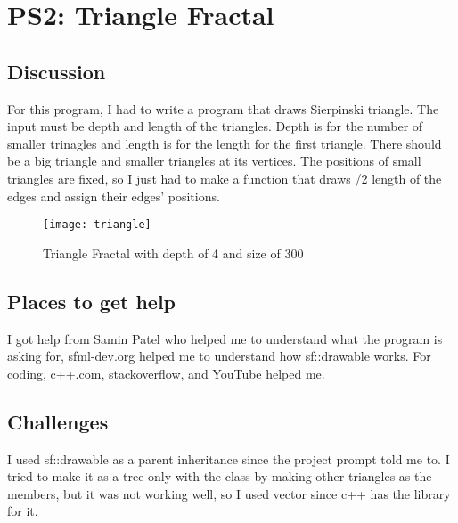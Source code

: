 \section{PS2: Triangle Fractal}\label{sec:ps2}

\subsection{Discussion}\label{sec:ps2:disc}

For this program, I had to write a program that draws Sierpinski triangle. The input must be depth and length of the triangles. Depth is for the number of smaller trinagles and length is for the length for the first triangle. There should be a big triangle and smaller triangles at its vertices. The positions of small triangles are fixed, so I just had to make a function that draws /2 length of the edges and assign their edges' positions.

\begin{figure}[tbh]
	\centering
	\texttt{[image: triangle]}
	\caption{Triangle Fractal with depth of 4 and size of 300}
	\label{fig:Triangles}
\end{figure}


\subsection{Places to get help}
I got help from Samin Patel who helped me to understand what the program is asking for, sfml-dev.org helped me to understand how sf::drawable works.
For coding, c++.com, stackoverflow, and YouTube helped me.



\subsection{Challenges}\label{sec:ps2:challenges}

I used sf::drawable as a parent inheritance since the project prompt told me to. I tried to make it as a tree only with the class by making other triangles as the members, but it was not working well, so I used vector since c++ has the library for it.

